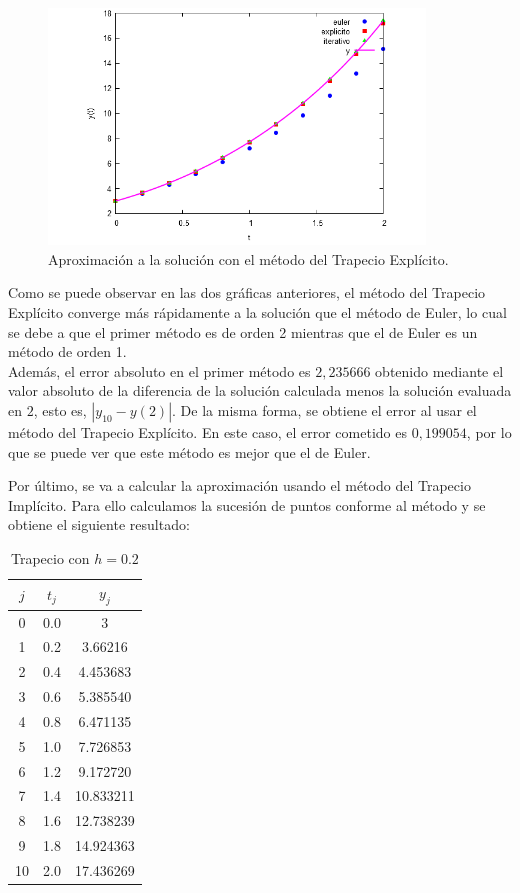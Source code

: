 \documentclass{article}
\theoremstyle{theorem-style}  %
\theoremstyle{definition-style}
\theoremstyle{example-style}
\begin{document}
	\begin{figure}[h]
		\centering
		\includegraphics[width=10cm]{./Images/ejtp1-2.png}
		\caption{Aproximación a la solución con el método del Trapecio Explícito.} 
		\label{fig:aprox2}
	\end{figure}

Como se puede observar en las dos gráficas anteriores, el método del Trapecio Explícito converge más rápidamente a la solución que el método de Euler, lo cual se debe a que el primer método es de orden 2 mientras que el de Euler es un método de orden 1.\\

Además, el error absoluto en el primer método es $2,235666$ obtenido mediante el valor absoluto de la diferencia de la solución calculada menos la solución evaluada en $2$, esto es, $|y_{10} - y(2)|$. De la misma forma, se obtiene el error al usar el método del Trapecio Explícito. En este caso, el error cometido es $0,199054$, por lo que se puede ver que este método es mejor que el de Euler.
 
Por último, se va a calcular la aproximación usando el método del Trapecio Implícito. Para ello calculamos la sucesión de puntos conforme al método y se obtiene el siguiente resultado:

	\begin{table}[H]
		\centering
		\begin{tabular}{|| c | c | c ||}
			\hline
			\hline $j$ &  $t_j $ & $y_j$\\
			\hline 0 & 0.0 & 3 \\
			\hline 1 & 0.2 & 3.66216  \\
			\hline 2 & 0.4 & 4.453683 \\
			\hline 3 & 0.6 & 5.385540 \\
			\hline 4 & 0.8 & 6.471135 \\
			\hline 5 & 1.0 & 7.726853 \\
			\hline 6 & 1.2 & 9.172720 \\
			\hline 7 & 1.4 & 10.833211 \\
			\hline 8 & 1.6 & 12.738239 \\
			\hline 9 & 1.8 & 14.924363 \\
			\hline 10 & 2.0 & 17.436269 \\
		\end{tabular}
		\caption{Trapecio con $h=0.2$}
		\label{table:trapecio-ejtp1.3}
	\end{table}
\end{document}
